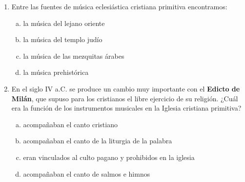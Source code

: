 \documentclass[letterpaper,12pt,notitlepage,spanish]{article}
\begin{document}
%
%
\begin{ejercicio}
	\begin{enumerate}[1.-]
%
%
		\item Entre las fuentes de música eclesiástica cristiana primitiva encontramos:
%
			\begin{enumerate}[a)]
				\item la música del lejano oriente
				\item la música del templo judío
				\item la música de las mezquitas árabes
				\item la música prehistórica
			\end{enumerate}
%
%
%
	\item En el siglo IV a.C. se produce un cambio muy importante con el \textbf{Edicto de Milán}, que supuso para los cristianos el libre ejercicio de su religión. ¿Cuál era la función de los instrumentos musicales en la Iglesia cristiana primitiva? 
%
			\begin{enumerate}[a)]	
				\item acompañaban el canto cristiano
				\item acompañaban el canto de la liturgia de la palabra
				\item eran vinculados al culto pagano y prohibidos en la iglesia
				\item acompañaban el canto de salmos e himnos
			\end{enumerate}
%	
	\end{enumerate}
\end{ejercicio}
%
%
\end{document}
